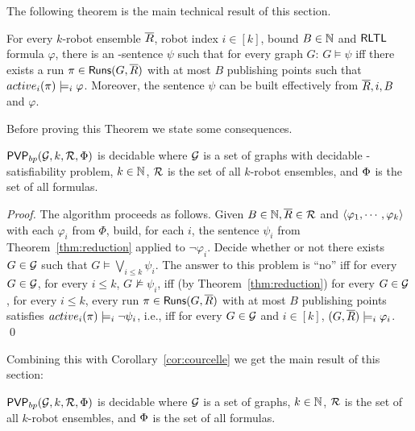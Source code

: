 The following theorem is the main technical result of this section.
 \begin{theorem}[Reduction] \label{thm:reduction} 
  For every $k$-robot ensemble $\overline{R}$, robot index $i \in [k]$, bound $B \in \mathbb{N}$ and $\textsf{RLTL}$ formula $\varphi$, there is an \msol-sentence $\psi$ such that for every graph $G$: 
  $G \models \psi$ iff there exists a run $\pi \in \mathsf{Runs}(G,\overline{R})$ with at most $B$ publishing points such that $active_i(\pi) \models_i \varphi$. 
  Moreover, the sentence $\psi$ can be built effectively from $\overline{R},i,B$ and $\varphi$.
 \end{theorem}

Before proving this Theorem we state some consequences.
\begin{theorem} \label{thm:PVPdec}
$\mathsf{PVP}_{bp}({\mathcal{G},k,\mathcal{R},\Phi})$ is decidable where $\mathcal{G}$ is a set of graphs with decidable \msol-satisfiability problem, 
$k \in \mathbb{N}$, $\mathcal{R}$ is the set of all $k$-robot ensembles, and $\Phi$ is the set of all \RLTL formulas.
\end{theorem}
%
\begin{proof}
The algorithm proceeds as follows. Given $B \in \mathbb{N},\overline{R} \in \mathcal{R}$ and $\langle {\varphi_1,\cdots,\varphi_k} \rangle$ with each $\varphi_i$ from $\Phi$, build, for each $i$, the sentence $\psi_i$ from Theorem~\ref{thm:reduction} applied to $\neg \varphi_i$. Decide whether or not there exists $G \in \mathcal{G}$ such that 
$G \models \bigvee_{i \leq k} \psi_i$. The answer to this problem is ``no'' iff for every $G \in \mathcal{G}$, for every $i \leq k$, 
$G \not \models \psi_i$,  iff (by Theorem~\ref{thm:reduction}) for every $G \in \mathcal{G}$, for every $i \leq k$, every run $\pi \in \mathsf{Runs}(G,\overline{R})$ with at most $B$ publishing points satisfies $active_i(\pi) \models_i \neg \psi_i$, i.e., 
iff for every $G \in \mathcal{G}$ and $i \in [k]$, $(G,\overline{R}) \models_i \varphi_i$.
\qed
\end{proof}

Combining this with Corollary~\ref{cor:courcelle} we get the main result of this section:
\begin{theorem} \label{thm:PVPdec}
$\mathsf{PVP}_{bp}({\mathcal{G},k,\mathcal{R},\Phi})$ is decidable where $\mathcal{G}$ is a \courcellian set of graphs, $k \in \mathbb{N}$, $\mathcal{R}$ is the set of all $k$-robot ensembles, and $\Phi$ is the set of all \RLTL formulas.
\end{theorem}

